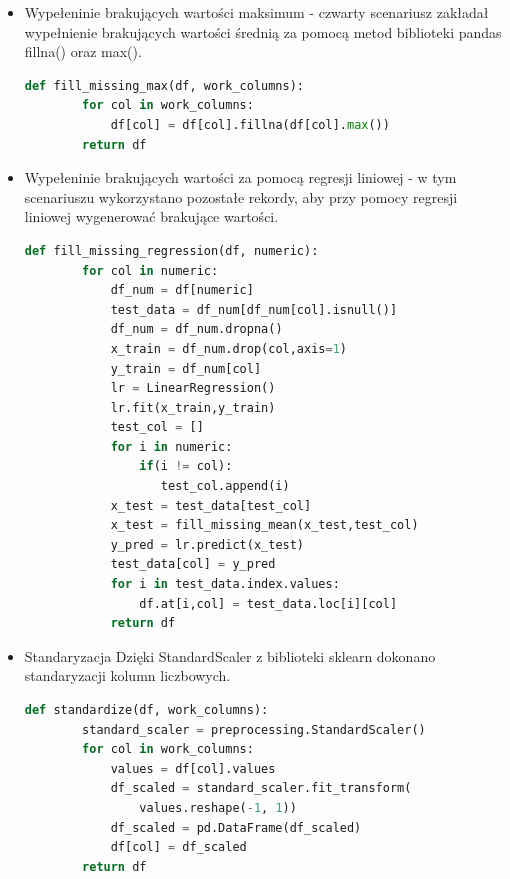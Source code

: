 \documentclass[oneside]{book}
\begin{document}
\begin{itemize}
\item Wypełeninie brakujących wartości maksimum -
czwarty scenariusz zakładał wypełnienie brakujących 
wartości średnią za pomocą metod biblioteki pandas 
fillna() oraz max().

\begin{lstlisting}[language=Python, caption={Wypełnienie 
    brakujących wartości maksimum}, captionpos=b]
    def fill_missing_max(df, work_columns):
        for col in work_columns:
            df[col] = df[col].fillna(df[col].max())
        return df
\end{lstlisting}

\item Wypełeninie brakujących wartości za pomocą regresji liniowej -
w tym scenariuszu wykorzystano pozostałe rekordy, 
aby przy pomocy regresji liniowej wygenerować 
brakujące wartości.

\begin{lstlisting}[language=Python, caption={Wypełnienie 
    brakujących wartości za pomocą regresji liniowej}, captionpos=b]
    def fill_missing_regression(df, numeric):    
        for col in numeric:
            df_num = df[numeric]
            test_data = df_num[df_num[col].isnull()]
            df_num = df_num.dropna()
            x_train = df_num.drop(col,axis=1)
            y_train = df_num[col]
            lr = LinearRegression()
            lr.fit(x_train,y_train)
            test_col = []
            for i in numeric:
                if(i != col):
                   test_col.append(i)
            x_test = test_data[test_col]
            x_test = fill_missing_mean(x_test,test_col)
            y_pred = lr.predict(x_test)
            test_data[col] = y_pred
            for i in test_data.index.values:
                df.at[i,col] = test_data.loc[i][col]
            return df
\end{lstlisting}

\item Standaryzacja
Dzięki StandardScaler z biblioteki sklearn dokonano 
standaryzacji kolumn liczbowych.

\begin{lstlisting}[language=Python, caption={Standaryzacja 
    kolumn liczbowych}, captionpos=b]
    def standardize(df, work_columns):
        standard_scaler = preprocessing.StandardScaler()
        for col in work_columns:
            values = df[col].values
            df_scaled = standard_scaler.fit_transform(
                values.reshape(-1, 1)) 
            df_scaled = pd.DataFrame(df_scaled)
            df[col] = df_scaled
        return df
\end{lstlisting}


\end{itemize}
\end{document}

